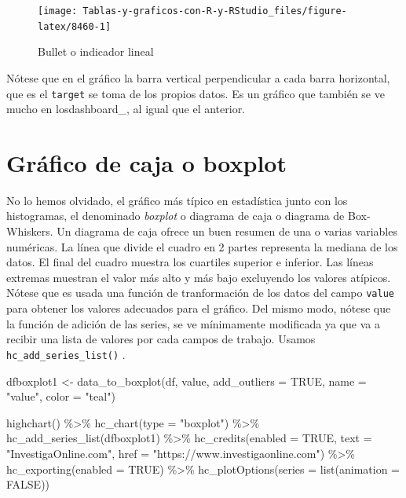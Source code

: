 \documentclass[
]{book}
\newenvironment{Shaded}{\begin{snugshade}}{\end{snugshade}}
\newcommand{\AttributeTok}[1]{\textcolor[rgb]{0.77,0.63,0.00}{#1}}
\newcommand{\ConstantTok}[1]{\textcolor[rgb]{0.00,0.00,0.00}{#1}}
\newcommand{\FunctionTok}[1]{\textcolor[rgb]{0.00,0.00,0.00}{#1}}
\newcommand{\NormalTok}[1]{#1}
\newcommand{\OtherTok}[1]{\textcolor[rgb]{0.56,0.35,0.01}{#1}}
\newcommand{\SpecialCharTok}[1]{\textcolor[rgb]{0.00,0.00,0.00}{#1}}
\newcommand{\StringTok}[1]{\textcolor[rgb]{0.31,0.60,0.02}{#1}}
\begin{document}
\begin{figure}[H]

{\centering \texttt{[image: Tablas-y-graficos-con-R-y-RStudio\_files/figure-latex/8460-1]} 

}

\caption{Bullet o indicador lineal}\label{fig:8460}
\end{figure}

Nótese que en el gráfico la barra vertical perpendicular a cada barra horizontal, que es el \texttt{target} se toma de los propios datos. Es un gráfico que también se ve mucho en losdashboard\_, al igual que el anterior.

\hypertarget{gruxe1fico-de-caja-o-boxplot}{%
\section{Gráfico de caja o boxplot}\label{gruxe1fico-de-caja-o-boxplot}}

No lo hemos olvidado, el gráfico más típico en estadística junto con los histogramas, el denominado \emph{boxplot} o diagrama de caja o diagrama de Box-Whiskers. Un diagrama de caja ofrece un buen resumen de una o varias variables numéricas. La línea que divide el cuadro en 2 partes representa la mediana de los datos. El final del cuadro muestra los cuartiles superior e inferior. Las líneas extremas muestran el valor más alto y más bajo excluyendo los valores atípicos. Nótese que es usada una función de tranformación de los datos del campo \texttt{value} para obtener los valores adecuados para el gráfico. Del mismo modo, nótese que la función de adición de las series, se ve mínimamente modificada ya que va a recibir una lista de valores por cada campos de trabajo. Usamos \texttt{hc\_add\_series\_list()} .

\begin{Shaded}
\begin{Highlighting}[]
\NormalTok{dfboxplot1 }\OtherTok{\textless{}{-}} \FunctionTok{data\_to\_boxplot}\NormalTok{(df, value, }\AttributeTok{add\_outliers =} \ConstantTok{TRUE}\NormalTok{,}
  \AttributeTok{name =} \StringTok{"value"}\NormalTok{, }\AttributeTok{color =} \StringTok{"teal"}\NormalTok{)}

\FunctionTok{highchart}\NormalTok{() }\SpecialCharTok{\%\textgreater{}\%}
  \FunctionTok{hc\_chart}\NormalTok{(}\AttributeTok{type =} \StringTok{"boxplot"}\NormalTok{) }\SpecialCharTok{\%\textgreater{}\%}
  \FunctionTok{hc\_add\_series\_list}\NormalTok{(dfboxplot1) }\SpecialCharTok{\%\textgreater{}\%}
  \FunctionTok{hc\_credits}\NormalTok{(}\AttributeTok{enabled =} \ConstantTok{TRUE}\NormalTok{, }\AttributeTok{text =} \StringTok{"InvestigaOnline.com"}\NormalTok{,}
    \AttributeTok{href =} \StringTok{"https://www.investigaonline.com"}\NormalTok{) }\SpecialCharTok{\%\textgreater{}\%}
  \FunctionTok{hc\_exporting}\NormalTok{(}\AttributeTok{enabled =} \ConstantTok{TRUE}\NormalTok{) }\SpecialCharTok{\%\textgreater{}\%}
  \FunctionTok{hc\_plotOptions}\NormalTok{(}\AttributeTok{series =} \FunctionTok{list}\NormalTok{(}\AttributeTok{animation =} \ConstantTok{FALSE}\NormalTok{))}
\end{Highlighting}
\end{Shaded}
\end{document}
